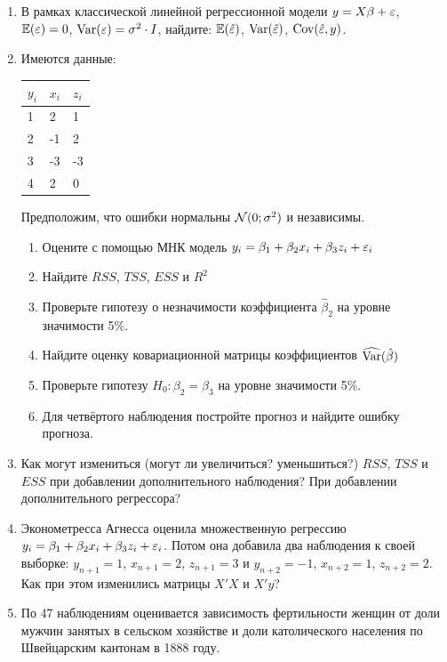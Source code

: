 \documentclass[12pt, a4paper]{article}
\begin{document}
\begin{enumerate}

\item В рамках классической линейной регрессионной модели $y=X\beta+ \varepsilon$, $\mathbb{E}(\varepsilon)=0$, $\operatorname{Var}(\varepsilon)=\sigma^2 \cdot I$, найдите: $\mathbb{E}(\hat{\varepsilon})$, $\operatorname{Var}(\hat{\varepsilon})$, $\operatorname{Cov}(\hat{\varepsilon}, y)$.

\item Имеются данные:

\begin{tabular}{lll}
\toprule
$y_i$ & $x_i$ & $z_i$ \\
\midrule
1 & 2 & 1 \\
2 & -1 & 2 \\
3 & -3 & -3 \\
4 & 2 & 0 \\
\bottomrule
\end{tabular}

Предположим, что ошибки нормальны $\mathcal{N}(0;\sigma^2)$ и независимы.

\begin{enumerate}
\item Оцените с помощью МНК модель $y_i=\beta_1 + \beta_2 x_i + \beta_3 z_i + \varepsilon_i$
\item Найдите $RSS$, $TSS$, $ESS$ и $R^2$
\item Проверьте гипотезу о незначимости коэффициента $\hat\beta_2$ на уровне значимости 5\%.
\item Найдите оценку ковариационной матрицы коэффициентов $\widehat{\operatorname{Var}}(\hat\beta)$
\item Проверьте гипотезу $H_0: \beta_2 = \beta_3$ на уровне значимости 5\%.
\item Для четвёртого наблюдения постройте прогноз и найдите ошибку прогноза.
\end{enumerate}

\item Как могут измениться (могут ли увеличиться? уменьшиться?) $RSS$, $TSS$ и $ESS$ при добавлении дополнительного наблюдения? При добавлении дополнительного регрессора?

\item Эконометресса Агнесса оценила множественную регрессию $y_i = \beta_1 + \beta_2 x_i + \beta_3 z_i + \varepsilon_i$. Потом она добавила два наблюдения к своей выборке: $y_{n+1}=1$, $x_{n+1}=2$, $z_{n+1}=3$ и $y_{n+2}=-1$, $x_{n+2}=1$, $z_{n+2}=2$. Как при этом изменились матрицы $X'X$ и $X'y$?


\item По 47 наблюдениям оценивается зависимость фертильности женщин от доли мужчин занятых в сельском хозяйстве и доли католического населения по Швейцарским кантонам в 1888 году.


\end{enumerate}
\end{document}

